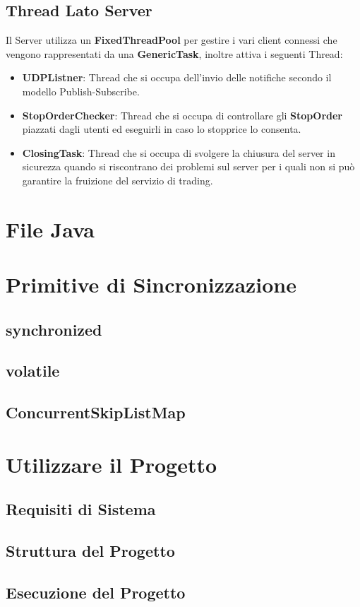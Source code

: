 \documentclass{article}
\begin{document}
\subsection{Thread Lato Server}
Il Server utilizza un \textbf{FixedThreadPool} per gestire i vari client connessi che vengono rappresentati da una \textbf{GenericTask}, inoltre attiva i seguenti Thread:
\begin{itemize}
  \item \textbf{UDPListner}: Thread che si occupa dell'invio delle notifiche secondo il modello Publish-Subscribe.
  \item \textbf{StopOrderChecker}: Thread che si occupa di controllare gli \textbf{StopOrder} piazzati dagli utenti ed eseguirli in caso lo stopprice lo consenta.
  \item \textbf{ClosingTask}: Thread che si occupa di svolgere la chiusura del server in sicurezza quando si riscontrano dei problemi sul server per i quali non si può garantire la fruizione del servizio di trading.
\end{itemize}

\section{File Java}


\section{Primitive di Sincronizzazione}

\subsection{synchronized}

\subsection{volatile}
\subsection{ConcurrentSkipListMap}

\section{Utilizzare il Progetto}

\subsection{Requisiti di Sistema}

\subsection{Struttura del Progetto}

\subsection{Esecuzione del Progetto}
\end{document}
